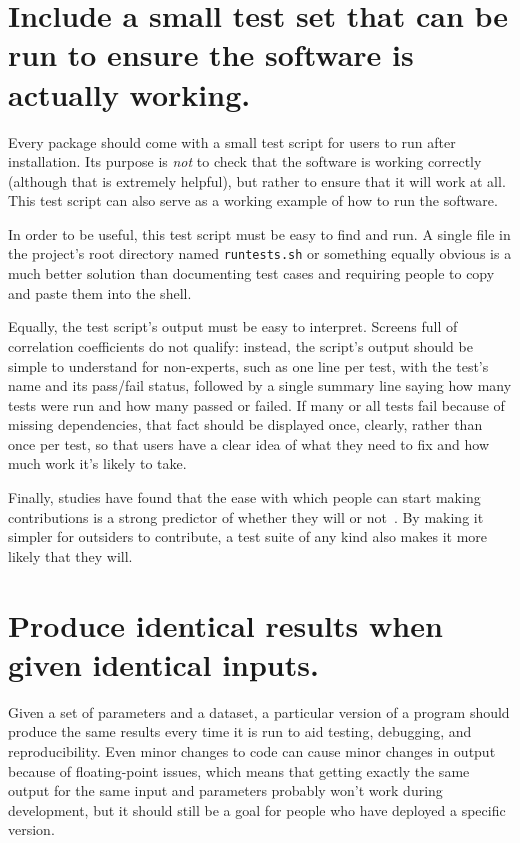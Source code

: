 \documentclass[10pt,letterpaper]{article}
\begin{document}
\section{Include a small test set that can be run to ensure the software is actually working.}

Every package should come with a small test script for users to run
after installation. Its purpose is \emph{not} to check that the software
is working correctly (although that is extremely helpful), but rather to
ensure that it will work at all. This test script can also serve as a
working example of how to run the software.

In order to be useful, this test script must be easy to find and run. A
single file in the project's root directory named \texttt{runtests.sh}
or something equally obvious is a much better solution than documenting
test cases and requiring people to copy and paste them into the shell.

Equally, the test script's output must be easy to interpret. Screens
full of correlation coefficients do not qualify: instead, the script's
output should be simple to understand for non-experts,
such as one line per test, with the test's name
and its pass/fail status, followed by a single summary line saying how
many tests were run and how many passed or failed. If many or all tests
fail because of missing dependencies, that fact should be displayed
once, clearly, rather than once per test, so that users have a clear
idea of what they need to fix and how much work it's likely to take.

Finally,
studies have found that the ease with which people can start making
contributions is a strong predictor of whether they will or not~\cite{steinmacher2015}.
By making it simpler for outsiders to contribute,
a test suite of any kind also makes it more likely that they will.

\section{Produce identical results when given identical inputs.}

Given a set of parameters and a dataset, a particular version of a program
should produce the same results every time it is run
to aid testing, debugging, and reproducibility.
Even minor changes to code can cause minor changes in output because of floating-point issues,
which means that getting exactly the same output for the same input and parameters
probably won't work during development,
but it should still be a goal for people who have deployed a specific version.
\end{document}

